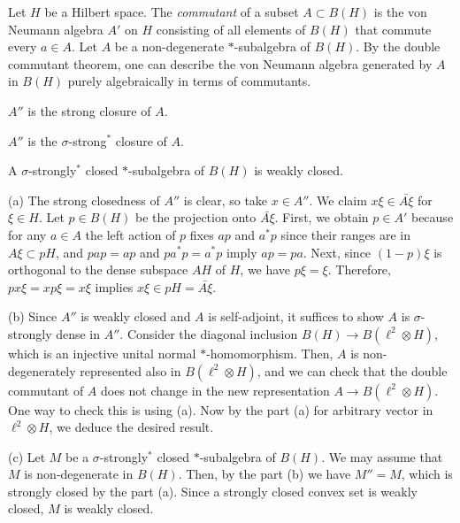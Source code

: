 \documentclass{../../large}
\begin{document}
\begin{prb}
Let $H$ be a Hilbert space.
The \emph{commutant} of a subset $A\subset B(H)$ is the von Neumann algebra $A'$ on $H$ consisting of all elements of $B(H)$ that commute every $a\in A$.
Let $A$ be a non-degenerate $*$-subalgebra of $B(H)$.
By the double commutant theorem, one can describe the von Neumann algebra generated by $A$ in $B(H)$ purely algebraically in terms of commutants.
\begin{parts}
\item $A''$ is the strong closure of $A$.
\item $A''$ is the $\sigma$-strong$^*$ closure of $A$.
\item A $\sigma$-strongly$^*$ closed $*$-subalgebra of $B(H)$ is weakly closed.
\end{parts}
\end{prb}
\begin{pf}
(a)
The strong closedness of $A''$ is clear, so take $x\in A''$.
We claim $x\xi\in\bar{A\xi}$ for $\xi\in H$.
Let $p\in B(H)$ be the projection onto $\bar{A\xi}$.
First, we obtain $p\in A'$ because for any $a\in A$ the left action of $p$ fixes $ap$ and $a^*p$ since their ranges are in $A\xi\subset pH$, and $pap=ap$ and $pa^*p=a^*p$ imply $ap=pa$.
Next, since $(1-p)\xi$ is orthogonal to the dense subspace $AH$ of $H$, we have $p\xi=\xi$.
Therefore, $px\xi=xp\xi=x\xi$ implies $x\xi\in pH=\bar{A\xi}$.

(b)
Since $A''$ is weakly closed and $A$ is self-adjoint, it suffices to show $A$ is $\sigma$-strongly dense in $A''$.
Consider the diagonal inclusion $B(H)\to B(\ell^2\otimes H)$, which is an injective unital normal $*$-homomorphism.
Then, $A$ is non-degenerately represented also in $B(\ell^2\otimes H)$, and we can check that the double commutant of $A$ does not change in the new representation $A\to B(\ell^2\otimes H)$.
One way to check this is using (a).
Now by the part (a) for arbitrary vector in $\ell^2\otimes H$, we deduce the desired result.

(c)
Let $M$ be a $\sigma$-strongly$^*$ closed $*$-subalgebra of $B(H)$.
We may assume that $M$ is non-degenerate in $B(H)$.
Then, by the part (b) we have $M''=M$, which is strongly closed by the part (a).
Since a strongly closed convex set is weakly closed, $M$ is weakly closed.
\end{pf}
\end{document}
